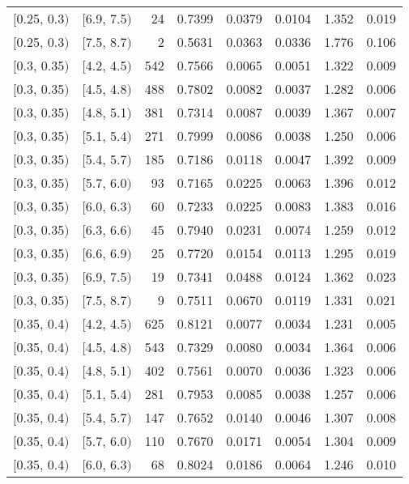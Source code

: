 \begin{longtable}{| l | l | r | r | r | r | r | r |}
        $[$0.25, 0.3$)$ & $[$6.9, 7.5$)$ & 24 & 0.7399 & 0.0379 & 0.0104 & 1.352 & 0.019 \\
        $[$0.25, 0.3$)$ & $[$7.5, 8.7$)$ & 2 & 0.5631 & 0.0363 & 0.0336 & 1.776 & 0.106 \\
        $[$0.3, 0.35$)$ & $[$4.2, 4.5$)$ & 542 & 0.7566 & 0.0065 & 0.0051 & 1.322 & 0.009 \\
        $[$0.3, 0.35$)$ & $[$4.5, 4.8$)$ & 488 & 0.7802 & 0.0082 & 0.0037 & 1.282 & 0.006 \\
        $[$0.3, 0.35$)$ & $[$4.8, 5.1$)$ & 381 & 0.7314 & 0.0087 & 0.0039 & 1.367 & 0.007 \\
        $[$0.3, 0.35$)$ & $[$5.1, 5.4$)$ & 271 & 0.7999 & 0.0086 & 0.0038 & 1.250 & 0.006 \\
        $[$0.3, 0.35$)$ & $[$5.4, 5.7$)$ & 185 & 0.7186 & 0.0118 & 0.0047 & 1.392 & 0.009 \\
        $[$0.3, 0.35$)$ & $[$5.7, 6.0$)$ & 93 & 0.7165 & 0.0225 & 0.0063 & 1.396 & 0.012 \\
        $[$0.3, 0.35$)$ & $[$6.0, 6.3$)$ & 60 & 0.7233 & 0.0225 & 0.0083 & 1.383 & 0.016 \\
        $[$0.3, 0.35$)$ & $[$6.3, 6.6$)$ & 45 & 0.7940 & 0.0231 & 0.0074 & 1.259 & 0.012 \\
        $[$0.3, 0.35$)$ & $[$6.6, 6.9$)$ & 25 & 0.7720 & 0.0154 & 0.0113 & 1.295 & 0.019 \\
        $[$0.3, 0.35$)$ & $[$6.9, 7.5$)$ & 19 & 0.7341 & 0.0488 & 0.0124 & 1.362 & 0.023 \\
        $[$0.3, 0.35$)$ & $[$7.5, 8.7$)$ & 9 & 0.7511 & 0.0670 & 0.0119 & 1.331 & 0.021 \\
        $[$0.35, 0.4$)$ & $[$4.2, 4.5$)$ & 625 & 0.8121 & 0.0077 & 0.0034 & 1.231 & 0.005 \\
        $[$0.35, 0.4$)$ & $[$4.5, 4.8$)$ & 543 & 0.7329 & 0.0080 & 0.0034 & 1.364 & 0.006 \\
        $[$0.35, 0.4$)$ & $[$4.8, 5.1$)$ & 402 & 0.7561 & 0.0070 & 0.0036 & 1.323 & 0.006 \\
        $[$0.35, 0.4$)$ & $[$5.1, 5.4$)$ & 281 & 0.7953 & 0.0085 & 0.0038 & 1.257 & 0.006 \\
        $[$0.35, 0.4$)$ & $[$5.4, 5.7$)$ & 147 & 0.7652 & 0.0140 & 0.0046 & 1.307 & 0.008 \\
        $[$0.35, 0.4$)$ & $[$5.7, 6.0$)$ & 110 & 0.7670 & 0.0171 & 0.0054 & 1.304 & 0.009 \\
        $[$0.35, 0.4$)$ & $[$6.0, 6.3$)$ & 68 & 0.8024 & 0.0186 & 0.0064 & 1.246 & 0.010 \\

\end{longtable}
